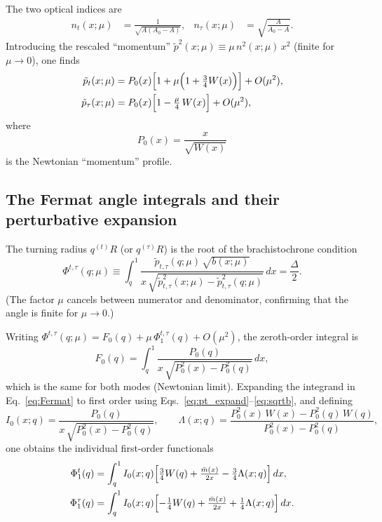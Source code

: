 The two optical indices are
\begin{align}
    n_t(x;\mu) &= \frac{1}{\sqrt{A(A_0-A)}}, &
    n_\tau(x;\mu) &= \sqrt{\frac{A}{A_0-A}}.
\end{align}
Introducing the rescaled ``momentum''
$\tilde{p}^2(x;\mu) \equiv \mu\,n^2(x;\mu)\,x^2$ (finite for $\mu\to 0$),
one finds
\begin{align}
    \tilde{p}_t(x;\mu)   &= P_0(x)\Bigl[1 + \mu\Bigl(1 + \tfrac{3}{4}W(x)\Bigr)\Bigr] + O(\mu^2),
    \label{eq:pt_expand}\\
    \tilde{p}_\tau(x;\mu) &= P_0(x)\Bigl[1 - \tfrac{\mu}{4}\,W(x)\Bigr] + O(\mu^2),
    \label{eq:ptau_expand}
\end{align}
where
\begin{equation}
    P_0(x) = \frac{x}{\sqrt{W(x)}}
    \label{eq:P0}
\end{equation}
is the Newtonian ``momentum'' profile.

\subsection{The Fermat angle integrals and their perturbative expansion}

The turning radius $q^{(t)}R$ (or $q^{(\tau)}R$) is the root of the
brachistochrone condition
\begin{equation}
    \Phi^{t,\tau}(q;\mu) \equiv
    \int_q^1
    \frac{\tilde{p}_{t,\tau}(q;\mu)\,\sqrt{b(x;\mu)}}
         {x\,\sqrt{\tilde{p}_{t,\tau}^2(x;\mu) - \tilde{p}_{t,\tau}^2(q;\mu)}}
    \,dx
    = \frac{\Delta}{2}.
    \label{eq:Fermat}
\end{equation}
(The factor $\mu$ cancels between numerator and denominator, confirming that
the angle is finite for $\mu\to0$.)

Writing $\Phi^{t,\tau}(q;\mu) = F_0(q) + \mu\,\Phi_1^{t,\tau}(q) + O(\mu^2)$,
the zeroth-order integral is
\begin{equation}
    F_0(q) = \int_q^1
    \frac{P_0(q)}{x\,\sqrt{P_0^2(x)-P_0^2(q)}}\,dx,
    \label{eq:F0}
\end{equation}
which is the same for both modes (Newtonian limit).
Expanding the integrand in Eq.~\eqref{eq:Fermat} to first order using
Eqs.~\eqref{eq:pt_expand}--\eqref{eq:sqrtb}, and defining
\begin{equation}
    I_0(x;q) = \frac{P_0(q)}{x\,\sqrt{P_0^2(x)-P_0^2(q)}}, \qquad
    \Lambda(x;q) = \frac{P_0^2(x)\,W(x) - P_0^2(q)\,W(q)}{P_0^2(x)-P_0^2(q)},
\end{equation}
one obtains the individual first-order functionals
\begin{align}
    \Phi_1^t(q) &= \int_q^1 I_0(x;q)
        \Bigl[\tfrac{3}{4}W(q) + \tfrac{\bar{m}(x)}{2x} - \tfrac{3}{4}\Lambda(x;q)\Bigr]\,dx,
    \label{eq:Phi1t}\\
    \Phi_1^\tau(q) &= \int_q^1 I_0(x;q)
        \Bigl[-\tfrac{1}{4}W(q) + \tfrac{\bar{m}(x)}{2x} + \tfrac{1}{4}\Lambda(x;q)\Bigr]\,dx.
    \label{eq:Phi1tau}
\end{align}

